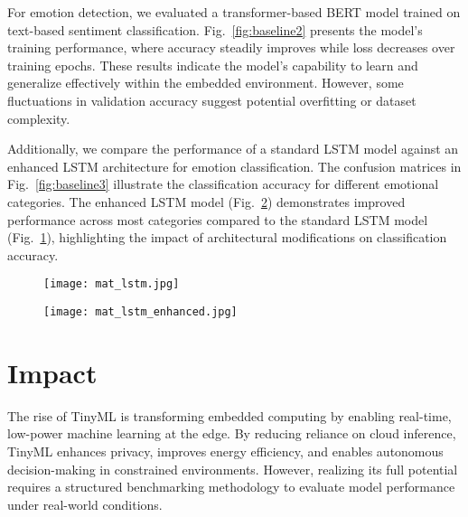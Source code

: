 \documentclass[conference]{IEEEtran}
\begin{document}
For emotion detection, we evaluated a transformer-based BERT model trained on text-based sentiment classification. Fig.~\ref{fig:baseline2} presents the model's training performance, where accuracy steadily improves while loss decreases over training epochs. These results indicate the model's capability to learn and generalize effectively within the embedded environment. However, some fluctuations in validation accuracy suggest potential overfitting or dataset complexity.

Additionally, we compare the performance of a standard LSTM model against an enhanced LSTM architecture for emotion classification. The confusion matrices in Fig.~\ref{fig:baseline3} illustrate the classification accuracy for different emotional categories. The enhanced LSTM model (Fig.~\ref{plots:3-b}) demonstrates improved performance across most categories compared to the standard LSTM model (Fig.~\ref{plots:3-a}), highlighting the impact of architectural modifications on classification accuracy.

\begin{figure*}[!htbp]
\centering
\captionsetup[subfigure]{justification=centering}
\captionsetup{justification=centering}

  \begin{subfigure}{0.48\linewidth}
  \centering
    \texttt{[image: mat\_lstm.jpg]}
    \caption{}
    \label{plots:3-a}
  \end{subfigure}
  \hfill
  \begin{subfigure}{0.48\linewidth}
  \centering
    \texttt{[image: mat\_lstm\_enhanced.jpg]}
    \caption{}
    \label{plots:3-b}
  \end{subfigure}

  \caption{Confusion matrix showing the performance of LSTM and enhanced LSTM.}
  \label{fig:baseline3}
\end{figure*}

\section{Impact}

The rise of TinyML is transforming embedded computing by enabling real-time, low-power machine learning at the edge. By reducing reliance on cloud inference, TinyML enhances privacy, improves energy efficiency, and enables autonomous decision-making in constrained environments. However, realizing its full potential requires a structured benchmarking methodology to evaluate model performance under real-world conditions.
\end{document}
